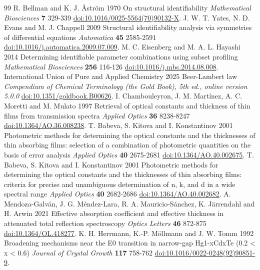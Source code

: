 \begin{thebibliography}{99}
 R. Bellman and K. J. Åström 1970 On structural identifiability \textit{Mathematical Biosciences} \textbf{7} 329-339 \href{https://doi.org/10.1016/0025-5564(70)90132-X}{doi:10.1016/0025-5564(70)90132-X}.
 J. W. T. Yates, N. D. Evans and M. J. Chappell 2009 Structural identifiability analysis via symmetries of differential equations \textit{Automatica} \textbf{45} 2585-2591 \href{https://doi.org/10.1016/j.automatica.2009.07.009}{doi:10.1016/j.automatica.2009.07.009}.
 M. C. Eisenberg and M. A. L. Hayashi 2014 Determining identifiable parameter combinations using subset profiling \textit{Mathematical Biosciences} \textbf{256} 116-126 \href{https://doi.org/10.1016/j.mbs.2014.08.008}{doi:10.1016/j.mbs.2014.08.008}.
 International Union of Pure and Applied Chemistry 2025 Beer-Lambert law \textit{Compendium of Chemical Terminology (the Gold Book), 5th ed., online version 5.0.0} \href{https://doi.org/10.1351/goldbook.B00626}{doi:10.1351/goldbook.B00626}.
 I. Chambouleyron, J. M. Martínez, A. C. Moretti and M. Mulato 1997 Retrieval of optical constants and thickness of thin films from transmission spectra \textit{Applied Optics} \textbf{36} 8238-8247 \href{https://doi.org/10.1364/AO.36.008238}{doi:10.1364/AO.36.008238}.
 T. Babeva, S. Kitova and I. Konstantinov 2001 Photometric methods for determining the optical constants and the thicknesses of thin absorbing films: selection of a combination of photometric quantities on the basis of error analysis \textit{Applied Optics} \textbf{40} 2675-2681 \href{https://doi.org/10.1364/AO.40.002675}{doi:10.1364/AO.40.002675}.
 T. Babeva, S. Kitova and I. Konstantinov 2001 Photometric methods for determining the optical constants and the thicknesses of thin absorbing films: criteria for precise and unambiguous determination of n, k, and d in a wide spectral range \textit{Applied Optics} \textbf{40} 2682-2686 \href{https://doi.org/10.1364/AO.40.002682}{doi:10.1364/AO.40.002682}.
 A. Mendoza-Galván, J. G. Méndez-Lara, R. A. Mauricio-Sánchez, K. Järrendahl and H. Arwin 2021 Effective absorption coefficient and effective thickness in attenuated total reflection spectroscopy \textit{Optics Letters} \textbf{46} 872-875 \href{https://doi.org/10.1364/OL.418277}{doi:10.1364/OL.418277}.
 K. H. Herrmann, K.-P. Möllmann and J. W. Tomm 1992 Broadening mechanisms near the E0 transition in narrow-gap Hg1-xCdxTe (0.2 < x < 0.6) \textit{Journal of Crystal Growth} \textbf{117} 758-762 \href{https://doi.org/10.1016/0022-0248(92)90851-9}{doi:10.1016/0022-0248(92)90851-9}.

\end{thebibliography}
